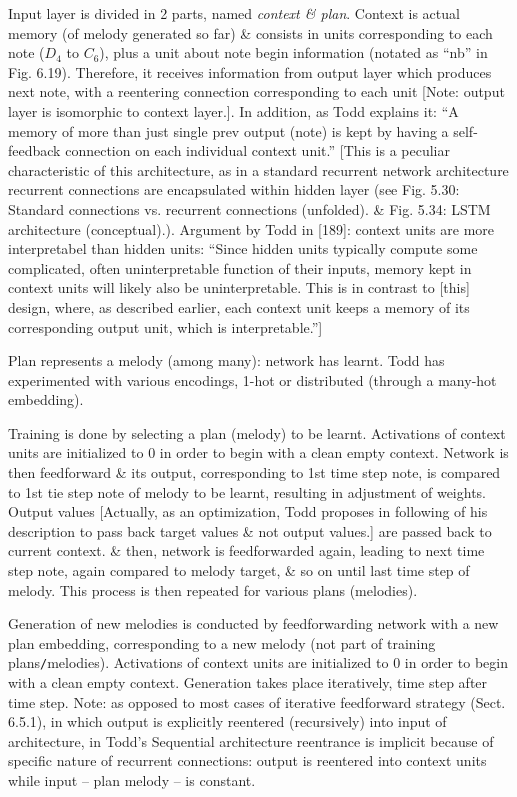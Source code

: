 \documentclass{article}
\begin{document}
\begin{itemize}
\begin{itemize}
\begin{itemize}
			Input layer is divided in 2 parts, named {\it context \& plan}. Context is actual memory (of melody generated so far) \& consists in units corresponding to each note ($D_4$ to $C_6$), plus a unit about note begin information (notated as ``nb'' in {\sf Fig. 6.19}). Therefore, it receives information from output layer which produces next note, with a reentering connection corresponding to each unit [Note: output layer is isomorphic to context layer.]. In addition, as {\sc Todd} explains it: ``A memory of more than just single prev output (note) is kept by having a self-feedback connection on each individual context unit.'' [This is a peculiar characteristic of this architecture, as in a standard recurrent network architecture recurrent connections are encapsulated within hidden layer (see {\sf Fig. 5.30: Standard connections vs. recurrent connections (unfolded).} \& {\sf Fig. 5.34: LSTM architecture (conceptual).}). Argument by {\sc Todd} in [189]: context units are more interpretabel than hidden units: ``Since hidden units typically compute some complicated, often uninterpretable function of their inputs, memory kept in context units will likely also be uninterpretable. This is in contrast to [this] design, where, as described earlier, each context unit keeps a memory of its corresponding output unit, which is interpretable.'']
			
			Plan represents a melody (among many): network has learnt. {\sc Todd} has experimented with various encodings, 1-hot or distributed (through a many-hot embedding).
			
			Training is done by selecting a plan (melody) to be learnt. Activations of context units are initialized to 0 in order to begin with a clean empty context. Network is then feedforward \& its output, corresponding to 1st time step note, is compared to 1st tie step note of melody to be learnt, resulting in adjustment of weights. Output values [Actually, as an optimization, {\sc Todd} proposes in following of his description to pass back target values \& not output values.] are passed back to current context. \& then, network is feedforwarded again, leading to next time step note, again compared to melody target, \& so on until last time step of melody. This process is then repeated for various plans (melodies).
			
			Generation of new melodies is conducted by feedforwarding network with a new plan embedding, corresponding to a new melody (not part of training plans{\tt/}melodies). Activations of context units are initialized to 0 in order to begin with a clean empty context. Generation takes place iteratively, time step after time step. Note: as opposed to most cases of iterative feedforward strategy (Sect. 6.5.1), in which output is explicitly reentered (recursively) into input of architecture, in {\sc Todd}'s Sequential architecture reentrance is implicit because of specific nature of recurrent connections: output is reentered into context units while input -- plan melody -- is constant.
			

\end{itemize}
\end{itemize}
\end{itemize}
\end{document}
